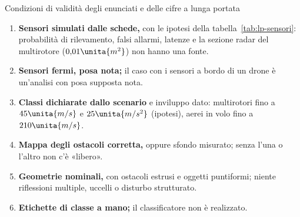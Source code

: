 \begin{riquadro}{Condizioni di validità degli enunciati e delle cifre a lunga portata}
\begin{enumerate}[label=\arabic*.,itemsep=1pt]
\item \textbf{Sensori simulati dalle schede,} con le ipotesi della tabella~\ref{tab:lp-sensori}: probabilità di rilevamento, falsi allarmi, latenze e la sezione radar del multirotore ($0{,}01\unita{m^2}$) non hanno una fonte.
\item \textbf{Sensori fermi, posa nota;} il caso con i sensori a bordo di un drone è un'analisi con posa supposta nota.
\item \textbf{Classi dichiarate dallo scenario} e inviluppo dato: multirotori fino a $45\unita{m/s}$ e $25\unita{m/s^2}$ (ipotesi), aerei in volo fino a $210\unita{m/s}$.
\item \textbf{Mappa degli ostacoli corretta,} oppure sfondo misurato; senza l'una o l'altro non c'è «libero».
\item \textbf{Geometrie nominali,} con ostacoli estrusi e oggetti puntiformi; niente riflessioni multiple, uccelli o disturbo strutturato.
\item \textbf{Etichette di classe a mano;} il classificatore non è realizzato.
\end{enumerate}
\end{riquadro}
